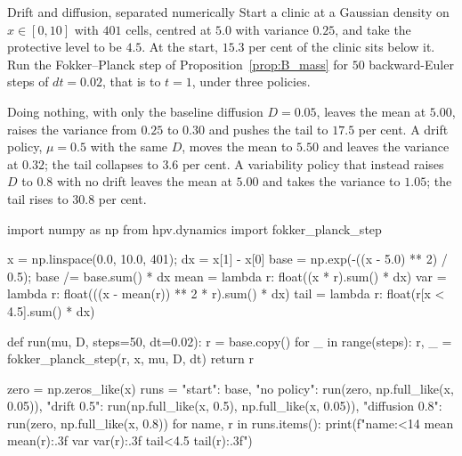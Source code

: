 \begin{workedexample}{Drift and diffusion, separated numerically}
Start a clinic at a Gaussian density on $x\in[0,10]$ with $401$ cells, centred
at $5.0$ with variance $0.25$, and take the protective level to be $4.5$. At
the start, $15.3$ per cent of the clinic sits below it. Run the
Fokker--Planck step of Proposition~\ref{prop:B_mass} for $50$ backward-Euler
steps of $dt=0.02$, that is to $t=1$, under three policies.

Doing nothing, with only the baseline diffusion $D=0.05$, leaves the mean at
$5.00$, raises the variance from $0.25$ to $0.30$ and pushes the tail to
$17.5$ per cent. A drift policy, $\mu=0.5$ with the same $D$, moves the mean to
$5.50$ and leaves the variance at $0.32$; the tail collapses to $3.6$ per cent.
A variability policy that instead raises $D$ to $0.8$ with no drift leaves the
mean at $5.00$ and takes the variance to $1.05$; the tail rises to $30.8$ per
cent.

\begin{wecode}[Python]
import numpy as np
from hpv.dynamics import fokker_planck_step

x = np.linspace(0.0, 10.0, 401); dx = x[1] - x[0]
base = np.exp(-((x - 5.0) ** 2) / 0.5); base /= base.sum() * dx
mean = lambda r: float((x * r).sum() * dx)
var = lambda r: float(((x - mean(r)) ** 2 * r).sum() * dx)
tail = lambda r: float(r[x < 4.5].sum() * dx)

def run(mu, D, steps=50, dt=0.02):
    r = base.copy()
    for _ in range(steps):
        r, _ = fokker_planck_step(r, x, mu, D, dt)
    return r

zero = np.zeros_like(x)
runs = {"start": base,
        "no policy": run(zero, np.full_like(x, 0.05)),
        "drift 0.5": run(np.full_like(x, 0.5), np.full_like(x, 0.05)),
        "diffusion 0.8": run(zero, np.full_like(x, 0.8))}
for name, r in runs.items():
    print(f"{name:<14} mean {mean(r):.3f}  var {var(r):.3f}  tail<4.5 {tail(r):.3f}")
\end{wecode}

\end{workedexample}

